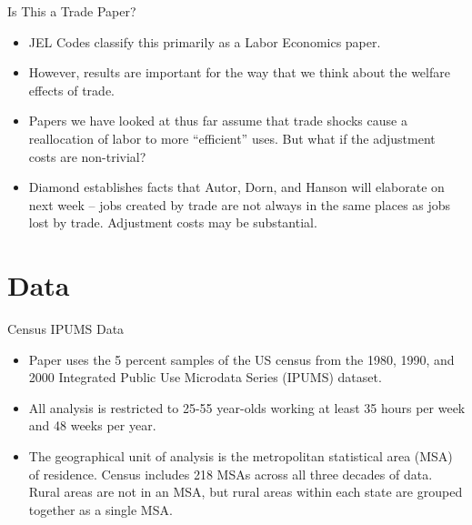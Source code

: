 \documentclass[aspectratio=169]{beamer}
\begin{document}
\begin{frame}{Is This a Trade Paper?}

\begin{itemize}
    \item<1-> JEL Codes classify this primarily as a Labor Economics paper.
    \item<2-> However, results are important for the way that we think about the welfare effects of trade.
    \item<3-> Papers we have looked at thus far assume that trade shocks cause a reallocation of labor to more ``efficient” uses.  But what if the adjustment costs are non-trivial?
    \item<4-> Diamond establishes facts that Autor, Dorn, and Hanson will elaborate on next week – jobs created by trade are not always in the same places as jobs lost by trade.  Adjustment costs may be substantial.
\end{itemize}
    
\end{frame}


\section{Data}


\begin{frame}{Census IPUMS Data}

\begin{itemize}
    \item<1-> Paper uses the 5 percent samples of the US census from the 1980, 1990, and 2000 Integrated Public Use Microdata Series (IPUMS) dataset.
    \item<2-> All analysis is restricted to 25-55 year-olds working at least 35 hours per week and 48 weeks per year.
    \item<3-> The geographical unit of analysis is the metropolitan statistical area (MSA) of residence.  Census includes 218 MSAs across all three decades of data.  Rural areas are not in an MSA, but rural areas within each state are grouped together as a single MSA.
\end{itemize}
    
\end{frame}

\end{document}
